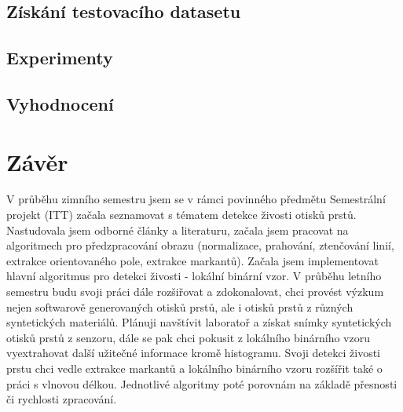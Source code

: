 \section{Získání testovacího datasetu}

\section{Experimenty}

\section{Vyhodnocení}






\label{citace}



\chapter{Závěr}
V průběhu zimního semestru jsem se v rámci povinného předmětu Semestrální projekt (ITT) začala seznamovat s tématem detekce živosti otisků prstů. Nastudovala jsem odborné články a literaturu, začala jsem pracovat na algoritmech pro předzpracování obrazu (normalizace, prahování, ztenčování linií, extrakce orientovaného pole, extrakce markantů). Začala jsem implementovat hlavní algoritmus pro detekci živosti - lokální binární vzor. V průběhu letního semestru budu svoji práci dále rozšiřovat a zdokonalovat, chci provést výzkum nejen softwarově generovaných otisků prstů, ale i otisků prstů z různých syntetických materiálů. Plánuji navštívit laboratoř a získat snímky syntetických otisků prstů z senzoru, dále se pak chci pokusit z lokálního binárního vzoru vyextrahovat další užitečné informace kromě histogramu. Svoji detekci živosti prstu chci vedle extrakce markantů a lokálního binárního vzoru rozšířit také o práci s vlnovou délkou. Jednotlivé algoritmy poté porovnám na základě přesnosti či rychlosti zpracování. 

\label{zaver}


